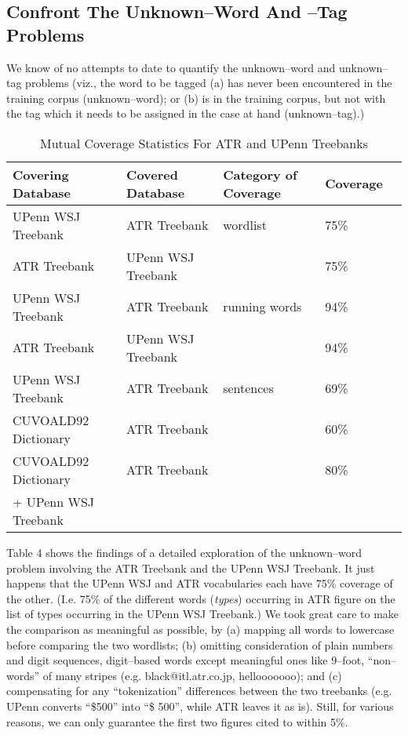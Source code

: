 \subsection{Confront The Unknown--Word And --Tag Problems}

We know of no attempts to date to quantify the unknown--word and
unknown--tag problems (viz., the word to be tagged (a) has never been
encountered in the training corpus (unknown--word); or (b) is in the
training corpus, but not with the tag which it needs to be assigned in
the case at hand (unknown--tag).)


\begin{table}
\begin{center}
\caption{Mutual Coverage Statistics For ATR and UPenn Treebanks}
\renewcommand{\arraystretch}{}
\begin{tabular}{|l|l|l|l|l|}
\hline
Covering Database    & Covered Database   & Category of Coverage & Coverage  \\ \hline
UPenn WSJ Treebank   & ATR Treebank       & wordlist             & 75\%      \\ \cline{1-2} \cline{4-4}
ATR Treebank         & UPenn WSJ Treebank &                      & 75\%      \\ \hline
UPenn WSJ Treebank   & ATR Treebank       & running words        & 94\%      \\ \cline{1-2} \cline{4-4}
ATR Treebank         & UPenn WSJ Treebank &                      & 94\%      \\ \hline
UPenn WSJ Treebank   & ATR Treebank       & sentences            & 69\%      \\ \cline{1-2} \cline{4-4}
CUVOALD92 Dictionary & ATR Treebank       &                      & 60\%      \\ \cline{1-2} \cline{4-4}
CUVOALD92 Dictionary & ATR Treebank       &                      & 80\%      \\ 
+ UPenn WSJ Treebank &                    &                      &           \\ \hline
\end{tabular}
\renewcommand{\arraystretch}{}
\end{center}
\end{table}

Table 4 shows the findings of a detailed exploration of the
unknown--word problem involving the ATR Treebank and the UPenn WSJ
Treebank. It just happens that the UPenn WSJ and ATR vocabularies each
have 75\% coverage of the other. (I.e. 75\% of the different words
({\em types}) occurring in ATR figure on the list of types occurring
in the UPenn WSJ Treebank.) We took great care to make the comparison
as meaningful as possible, by (a) mapping all words to lowercase
before comparing the two wordlists; (b) omitting consideration of
plain numbers and digit sequences, digit--based words except
meaningful ones like 9--foot, ``non--words'' of many stripes (e.g. 
black@itl.atr.co.jp, hellooooooo); and (c) compensating for any
``tokenization'' differences between the two treebanks (e.g. UPenn
converts ``\$500'' into ``\$ 500'', while ATR leaves it as is). Still,
for various reasons, we can only guarantee the first two figures cited
to within 5\%.

